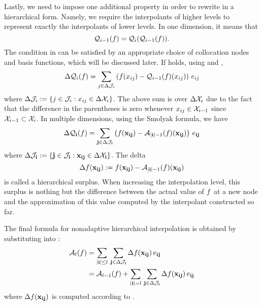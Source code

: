 Lastly, we need to impose one additional property in order to rewrite
 in a hierarchical form. Namely, we require the
interpolants of higher levels to represent exactly the interpolants of lower
levels. In one dimension, it means that
\begin{equation} \elab{tensor-exactness}
  \tensor{i - 1}(\f) = \tensor{i}(\tensor{i - 1}(\f)).
\end{equation}
The condition in  can be satisfied by an appropriate
choice of collocation nodes and basis functions, which will be discussed later.
If  holds, using  and
,
\[
  \Delta\mathcal{Q}_{i}(f) = \sum_{j \in \Delta\mathcal{J}_i} \left( f(x_{ij}) - \mathcal{Q}_{i - 1}(f)(x_{ij}) \right) \, e_{ij}
\]
where $\Delta\mathcal{J}_i := \{ j \in \mathcal{J}_i: x_{ij} \in \Delta\mathcal{X}_i \}$. The
above sum is over $\Delta\mathcal{X}_i$ due to the fact that the difference in the
parentheses is zero whenever $x_{ij} \in \mathcal{X}_{i - 1}$ since $\mathcal{X}_{i - 1} \subset
\mathcal{X}_i$. In multiple dimensions, using the Smolyak formula, we have
\begin{equation} \elab{tensor-delta}
  \Delta\tensor{\vi}(\f) = \sum_{\vj \in \Delta\index_\vi} \left( \f(\vx_{\vi\vj}) - \smolyak{|\vi| - 1}(\f)(\vx_{\vi\vj}) \right) \, \e_{\vi\vj}
\end{equation}
where $\Delta\mathcal{J}_{\mathbf{i}} := \{ \mathbf{j} \in \mathcal{J}_{\mathbf{i}}: \mathbf{x}_{\mathbf{i}\mathbf{j}} \in \Delta\mathcal{X}_{\mathbf{i}}
\}$. The delta
\begin{equation} \elab{surplus}
  \surplus(\vx_{\vi\vj}) := \f(\vx_{\vi\vj}) - \smolyak{|\vi| - 1}(\f)(\vx_{\vi\vj})
\end{equation}
is called a hierarchical surplus. When increasing the interpolation level, this
surplus is nothing but the difference between the actual value of $f$ at a new
node and the approximation of this value computed by the interpolant constructed
so far.

The final formula for nonadaptive hierarchical interpolation is obtained by
substituting  into :
\begin{align}
  \smolyak{l}(\f) &= \sum_{|\vi| \leq l} \, \sum_{\vj \in \Delta\index_\vi} \surplus(\vx_{\vi\vj}) \, \e_{\vi\vj} \elab{smolyak-hierarchical} \\
                  &= \smolyak{l-1}(\f) + \sum_{|\vi| = l} \, \sum_{\vj \in \Delta\index_\vi} \surplus(\vx_{\vi\vj}) \, \e_{\vi\vj} \nonumber
\end{align}
where $\Delta f(\mathbf{x}_{\mathbf{i}\mathbf{j}})$ is computed according to .
